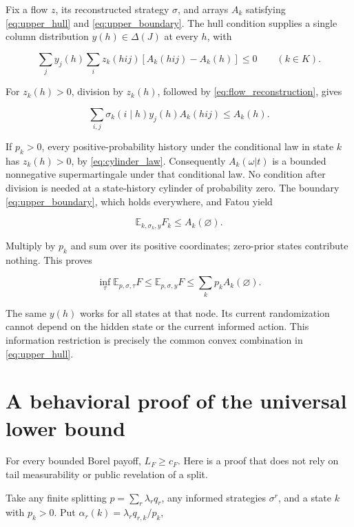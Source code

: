 \documentclass[11pt,a4paper]{article}
\begin{document}
Fix a flow \(z\), its reconstructed strategy \(\sigma\), and arrays \(A_k\) satisfying \eqref{eq:upper_hull} and \eqref{eq:upper_boundary}. The hull condition supplies a single column distribution \(y(h)\in\Delta(J)\) at every \(h\), with

\begin{equation}
\sum_jy_j(h)\sum_i z_k(hij)
 [A_k(hij)-A_k(h)]\le0\qquad(k\in K). \label{eq:response_weighted_step}
\end{equation}

For \(z_k(h)>0\), division by \(z_k(h)\), followed by \eqref{eq:flow_reconstruction}, gives

\begin{equation}
\sum_{i,j}\sigma_k(i\mid h)y_j(h)A_k(hij)\le A_k(h).
\label{eq:response_step}
\end{equation}

If \(p_k>0\), every positive-probability history under the conditional law in state \(k\) has \(z_k(h)>0\), by \eqref{eq:cylinder_law}. Consequently \(A_k(\omega|t)\) is a bounded nonnegative supermartingale under that conditional law. No condition after division is needed at a state-history cylinder of probability zero. The boundary \eqref{eq:upper_boundary}, which holds everywhere, and Fatou yield

\[
\mathbb E_{k,\sigma_k,y}F_k\le A_k(\varnothing).
\]

Multiply by \(p_k\) and sum over its positive coordinates; zero-prior states contribute nothing. This proves

\begin{equation}
\inf_\tau\mathbb E_{p,\sigma,\tau}F
\le\mathbb E_{p,\sigma,y}F
\le\sum_kp_k A_k(\varnothing). \label{eq:response_bound}
\end{equation}

The same \(y(h)\) works for all states at that node. Its current randomization cannot depend on the hidden state or the current informed action. This information restriction is precisely the common convex combination in \eqref{eq:upper_hull}.

\section{A behavioral proof of the universal lower bound}

For every bounded Borel payoff, \(L_F\ge c_F\). Here is a proof that does not rely on tail measurability or public revelation of a split.

Take any finite splitting \(p=\sum_r\lambda_rq_r\), any informed strategies \(\sigma^r\), and a state \(k\) with \(p_k>0\). Put \(\alpha_r(k)=\lambda_rq_{r,k}/p_k\),
\end{document}
